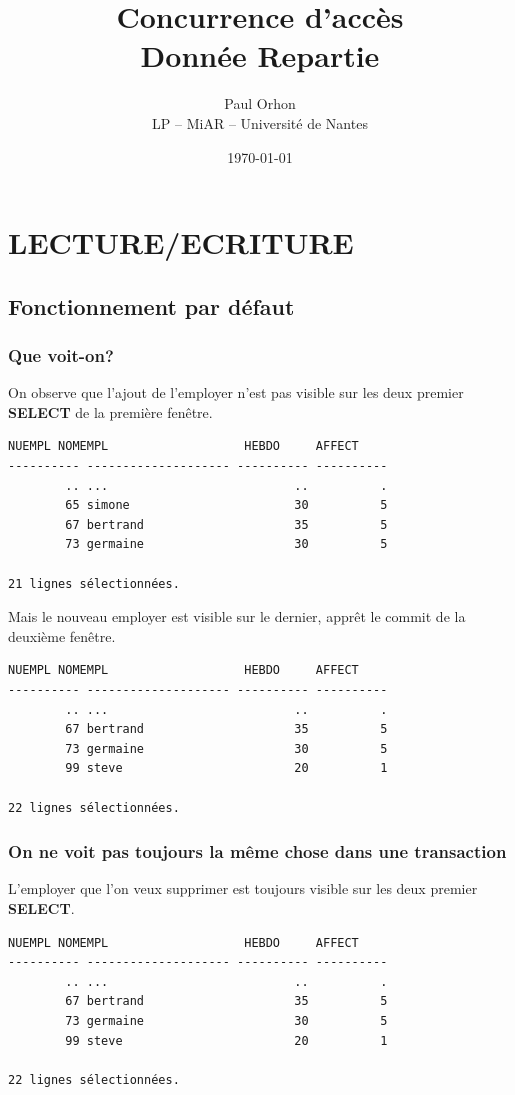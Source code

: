 \documentclass{article}
\title{\huge{Concurrence d’accès}\\
\normalsize Donnée Repartie}
\date{\today}
\author{Paul Orhon \\
\small LP -- MiAR -- Université de Nantes }
\begin{document}
\maketitle
\tableofcontents

\clearpage

\section{LECTURE/ECRITURE}
\subsection{Fonctionnement par défaut}
\subsubsection{Que voit-on?}

On observe que l'ajout de l'employer n'est pas visible sur les deux premier \textbf{SELECT} de la première fenêtre. 
\begin{lstlisting}[caption= Premier et deuxième select * from employe;]
    NUEMPL NOMEMPL                   HEBDO     AFFECT
---------- -------------------- ---------- ----------
        .. ...                          ..          .
        65 simone                       30          5
        67 bertrand                     35          5
        73 germaine                     30          5

21 lignes sélectionnées. 
\end{lstlisting}

Mais le nouveau employer est visible sur le dernier, apprêt le commit de la deuxième fenêtre.
\begin{lstlisting}[caption= Dernier select * from employe;]
    NUEMPL NOMEMPL                   HEBDO     AFFECT
---------- -------------------- ---------- ----------
        .. ...                          ..          .
        67 bertrand                     35          5
        73 germaine                     30          5
        99 steve                        20          1
    
22 lignes sélectionnées. 
\end{lstlisting}


\subsubsection{On ne voit pas toujours la même chose dans une transaction}

L'employer que l'on veux supprimer est toujours visible sur les deux premier \textbf{SELECT}.
\begin{lstlisting}[caption= Premier et deuxième select * from employe;]
    NUEMPL NOMEMPL                   HEBDO     AFFECT
---------- -------------------- ---------- ----------
        .. ...                          ..          .
        67 bertrand                     35          5
        73 germaine                     30          5
        99 steve                        20          1
    
22 lignes sélectionnées. 
\end{lstlisting}
\end{document}
